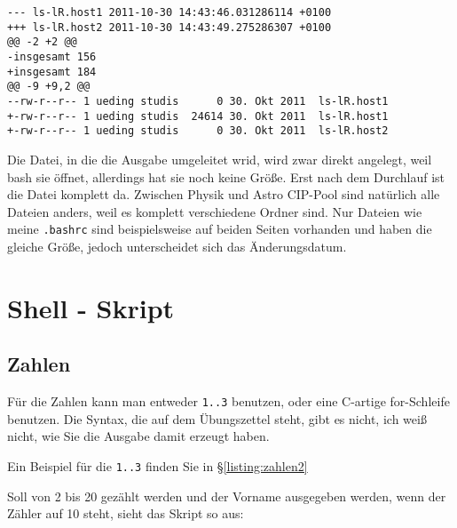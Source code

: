\documentclass[12pt]{report}
\begin{document}
\begin{lstlisting}[caption=Unterschied zwischen Ordnerinhalten]
--- ls-lR.host1 2011-10-30 14:43:46.031286114 +0100
+++ ls-lR.host2 2011-10-30 14:43:49.275286307 +0100
@@ -2 +2 @@
-insgesamt 156
+insgesamt 184
@@ -9 +9,2 @@
--rw-r--r-- 1 ueding studis      0 30. Okt 2011  ls-lR.host1
+-rw-r--r-- 1 ueding studis  24614 30. Okt 2011  ls-lR.host1
+-rw-r--r-- 1 ueding studis      0 30. Okt 2011  ls-lR.host2
\end{lstlisting}

Die Datei, in die die Ausgabe umgeleitet wrid, wird zwar direkt angelegt, weil bash sie öffnet, allerdings hat sie noch keine Größe. Erst nach dem Durchlauf ist die Datei komplett da. Zwischen Physik und Astro CIP-Pool sind natürlich alle Dateien anders, weil es komplett verschiedene Ordner sind. Nur Dateien wie meine \texttt{.bashrc} sind beispielsweise auf beiden Seiten vorhanden und haben die gleiche Größe, jedoch unterscheidet sich das Änderungsdatum.

\section{Shell - Skript}

\lstset{language=bash}





\subsection{Zahlen}

Für die Zahlen kann man entweder \texttt{{1..3}} benutzen, oder eine C-artige for-Schleife benutzen. Die Syntax, die auf dem Übungszettel steht, gibt es nicht, ich weiß nicht, wie Sie die Ausgabe damit erzeugt haben.

\lstset{language=bash}




Ein Beispiel für die \texttt{{1..3}} finden Sie in §\ref{listing:zahlen2}

Soll von 2 bis 20 gezählt werden und der Vorname ausgegeben werden, wenn der Zähler auf 10 steht, sieht das Skript so aus:


\lstset{language=bash}

\end{document}
